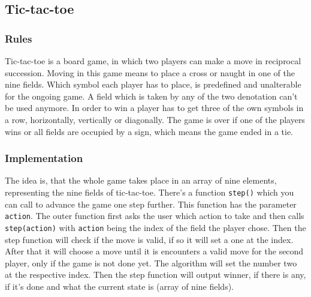 \documentclass[12pt]{article}
\begin{document}
\subsection{Tic-tac-toe}
\subsubsection{Rules}
Tic-tac-toe is a board game, in which two players can make a move in reciprocal succession. Moving in this game means to place a cross or naught in one of the nine fields. Which symbol each player has to place, is predefined and unalterable for the ongoing game. A field which is taken by any of the two denotation can't be used anymore. In order to win a player has to get three of the own symbols in a row, horizontally, vertically or diagonally. The game is over if one of the players wins or all fields are occupied by a sign, which means the game ended in a tie.
\subsubsection{Implementation}\label{sssec:impl}
The idea is, that the whole game takes place in an array of nine elements, representing the nine fields of tic-tac-toe. There's a function \lstinline{step()} which you can call to advance the game one step further. This function has the parameter \lstinline{action}. The outer function first asks the user which action to take and then calls \lstinline{step(action)} with \lstinline{action} being the index of the field the player chose. Then the step function will check if the move is valid, if so it will set a one at the index. After that it will choose a move until it is encounters a valid move for the second player, only if the game is not done yet. The algorithm will set the number two at the respective index. Then the step function will output winner, if there is any, if it's done and what the current \gls{state} is (array of nine fields).
\end{document}
